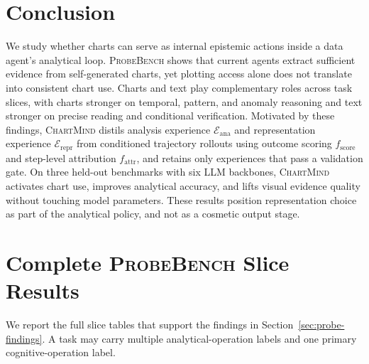 \documentclass{article}
\newcommand{\method}{\textsc{ChartMind}\xspace}
\newcommand{\probe}{\textsc{ProbeBench}\xspace}
\begin{document}
\section{Conclusion}
\label{sec:conclusion}

\noindent We study whether charts can serve as internal epistemic actions inside a data agent's analytical loop. \probe{} shows that current agents extract sufficient evidence from self-generated charts, yet plotting access alone does not translate into consistent chart use. Charts and text play complementary roles across task slices, with charts stronger on temporal, pattern, and anomaly reasoning and text stronger on precise reading and conditional verification. Motivated by these findings, \method{} distils analysis experience $\mathcal{E}_{\mathrm{ana}}$ and representation experience $\mathcal{E}_{\mathrm{repr}}$ from conditioned trajectory rollouts using outcome scoring $f_{\mathrm{score}}$ and step-level attribution $f_{\mathrm{attr}}$, and retains only experiences that pass a validation gate. On three held-out benchmarks with six LLM backbones, \method{} activates chart use, improves analytical accuracy, and lifts visual evidence quality without touching model parameters. These results position representation choice as part of the analytical policy, and not as a cosmetic output stage.




\appendix

\section{Complete \probe{} Slice Results}
\label{app:slices}

\noindent We report the full slice tables that support the findings in Section~\ref{sec:probe-findings}. A task may carry multiple analytical-operation labels and one primary cognitive-operation label.
\end{document}
